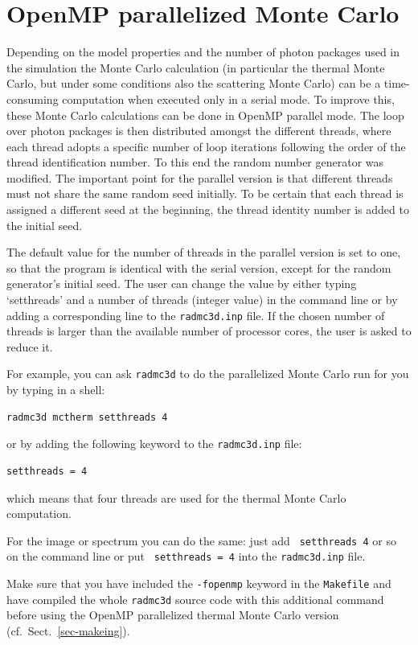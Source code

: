 \documentclass{report}
\begin{document}
\section{OpenMP parallelized Monte Carlo}
\label{sec-omp-mc}
%
Depending on the model properties and the number of photon packages used in
the simulation the Monte Carlo calculation (in particular the thermal Monte
Carlo, but under some conditions also the scattering Monte Carlo) can be a
time-consuming computation when executed only in a serial mode. To improve
this, these Monte Carlo calculations can be done in OpenMP parallel mode.
The loop over photon packages is then distributed amongst the different
threads, where each thread adopts a specific number of loop iterations
following the order of the thread identification number. To this end the
random number generator was modified. The important point for the parallel
version is that different threads must not share the same random seed
initially. To be certain that each thread is assigned a different seed at
the beginning, the thread identity number is added to the initial seed.

The default value for the number of threads in the parallel version is set
to one, so that the program is identical with the serial version, except for
the random generator's initial seed. The user can change the value by either
typing `setthreads’ and a number of threads (integer value) in the command
line or by adding a corresponding line to the {\small\tt radmc3d.inp}
file. If the chosen number of threads is larger than the available number of
processor cores, the user is asked to reduce it.

For example, you can ask {\small\tt radmc3d} to do the parallelized Monte
Carlo run for you by typing in a shell:
{\small\begin{verbatim}
radmc3d mctherm setthreads 4
\end{verbatim}}
or by adding the following keyword to the {\small\tt radmc3d.inp} file:
{\small\begin{verbatim}
setthreads = 4
\end{verbatim}}
which means that four threads are used for the thermal Monte Carlo
computation.

For the image or spectrum you can do the same: just add {\small\tt 
setthreads 4} or so on the command line or put {\small\tt 
setthreads = 4} into the {\small\tt radmc3d.inp} file.

Make sure that you have included the {\small\tt -fopenmp} keyword in the
{\small\tt Makefile} and have compiled the whole {\small\tt radmc3d} source
code with this additional command before using the OpenMP parallelized
thermal Monte Carlo version (cf.\ Sect.\ \ref{sec-makeing}).
\end{document}
